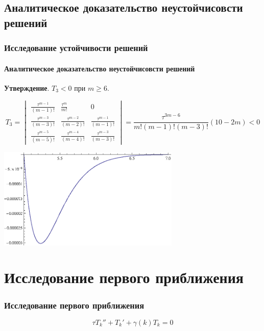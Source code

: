 \documentclass{beamer}
\numberwithin{equation}{section}
\begin{document}
    \subsection{Аналитическое доказательство неустойчисовсти решений}
    \begin{frame}
        \frametitle{Исследование устойчивости решений}
        \framesubtitle{Аналитическое доказательство неустойчисовсти решений}

        \textbf{Утверждение}. $T_3 < 0$ при $m \geq 6$.

        \begin{equation}
            T_3 = 
            \begin{vmatrix}
                \frac{\tau^{m-1}}{(m-1)!} & \frac{\tau^{m}}{m!} & 0\\
                \frac{\tau^{m-3}}{(m-3)!} & \frac{\tau^{m-2}}{(m-2)!} & \frac{\tau^{m-1}}{(m-1)!}\\
                \frac{\tau^{m-5}}{(m-5)!} & \frac{\tau^{m-4}}{(m-4)!} & \frac{\tau^{m-3}}{(m-3)!}
            \end{vmatrix} =
            \dfrac{\tau^{3m-6}}{m!(m-1)!(m-3)!} (10-2m) < 0
        \end{equation}

        \begin{center}
            \includegraphics[width=0.65\textwidth]{coefCheck.eps}
        \end{center}
    
    \end{frame}

    \section{Исследование первого приближения}
    \begin{frame}
        \frametitle{Исследование первого приближения}

        \begin{equation}
            \tau {T_k}'' + {T_k}' + \gamma(k) T_k = 0
        \end{equation}

    \end{frame}
\end{document}
